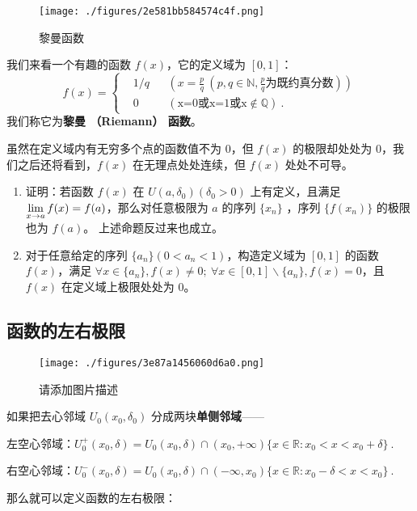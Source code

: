 \begin{figure}[ht]
\centering
\texttt{[image: ./figures/2e581bb584574c4f.png]}
\caption{黎曼函数} \label{fig_limfx_2}
\end{figure}

我们来看一个有趣的函数 $f(x)$，它的定义域为 $[0,1]$：
\begin{equation}
f(x)=\left\{
\begin{aligned} 
&1/q && (x=\frac{p}{q}\ (p,q\in \mathbb{N},\frac{p}{q}\text{为既约真分数}))\\
&0 && (\text{x=0或x=1或x}\notin \mathbb{Q})~.
\end{aligned}
\right.
\end{equation}
我们称它为\textbf{黎曼 （Riemann） 函数}。

虽然在定义域内有无穷多个点的函数值不为 $0$，但 $f(x)$ 的极限却处处为 $0$，我们之后还将看到，$f(x)$ 在无理点处处连续，但 $f(x)$ 处处不可导。

\begin{exercise}{}
\begin{enumerate}
\item 证明：若函数 $f(x)$ 在 $U(a,\delta_0)(\delta_0>0)$ 上有定义，且满足 $\large\lim\limits_{x\rightarrow a}f(x)=f(a)$，那么对任意极限为 $a$ 的序列 $\{x_n\}$ ，序列 $\{f(x_n)\}$ 的极限也为 $f(a)$。
     上述命题反过来也成立。
\item 对于任意给定的序列 $\{a_n\}(0<a_n<1)$，构造定义域为 $[0,1]$ 的函数 $f(x)$，满足 $\forall x\in \{a_n\},f(x)\neq 0;\ \forall x \in [0,1]\backslash \{a_n\},f(x)=0$，且 $f(x)$ 在定义域上极限处处为 $0$。
\end{enumerate}
\end{exercise}
\subsection{函数的左右极限}
\begin{figure}[ht]
\centering
\texttt{[image: ./figures/3e87a1456060d6a0.png]}
\caption{请添加图片描述} \label{fig_limfx_3}
\end{figure}
  如果把去心邻域 $U_0(x_0,\delta_0)$ 分成两块\textbf{单侧邻域}——

  左空心邻域：$U_0^+(x_0,\delta)=U_0(x_0,\delta)\cap (x_0,+\infty) \{x\in \mathbb{R} :x_0< x<x_0+\delta\}~.$

  右空心邻域：$U_0^-(x_0,\delta)=U_0(x_0,\delta)\cap (-\infty,x_0) \{x\in \mathbb{R} :x_0-\delta< x<x_0\}~.$

  那么就可以定义函数的左右极限：

